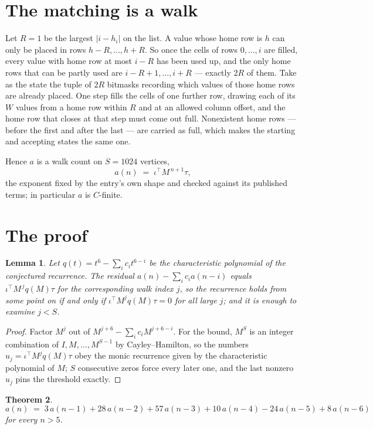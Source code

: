 \documentclass[11pt,a4paper]{article}
\theoremstyle{plain}
\newtheorem{theorem}{Theorem}
\newtheorem{lemma}[theorem]{Lemma}
\theoremstyle{definition}
\begin{document}
\section{The matching is a walk}

Let $R=1$ be the largest $|i-h_i|$ on the list. A value whose home row is $h$ can only be
placed in rows $h-R,\dots,h+R$. So once the cells of rows $0,\dots,i$ are filled, every
value with home row at most $i-R$ has been used up, and the only home rows that can be
partly used are $i-R+1,\dots,i+R$ --- exactly $2R$ of them. Take as the state the tuple of
$2R$ bitmasks recording which values of those home rows are already placed. One step fills
the cells of one further row, drawing each of its $W$ values from a home row within $R$
and at an allowed column offset, and the home row that closes at that step must come out
full. Nonexistent home rows --- before the first and after the last --- are carried as
full, which makes the starting and accepting states the same one.

Hence $a$ is a walk count on $S=1024$ vertices,
\[
a(n)\;=\;\iota^{\!\top}M^{\,n+1}\tau ,
\]
the exponent fixed by the entry's own shape and checked against its published terms; in
particular $a$ is $C$-finite.

\section{The proof}

\begin{lemma}\label{lem:crit}
Let $q(t)=t^{6}-\sum_i c_it^{6-i}$ be the characteristic polynomial of the
conjectured recurrence. The residual $a(n)-\sum_ic_ia(n-i)$ equals
$\iota^{\!\top}M^{\,j}q(M)\tau$ for the corresponding walk index $j$, so the recurrence
holds from some point on if and only if $\iota^{\!\top}M^{j}q(M)\tau=0$ for all large $j$;
and it is enough to examine $j<S$.
\end{lemma}

\begin{proof}
Factor $M^{j}$ out of $M^{j+6}-\sum_ic_iM^{j+6-i}$. For the bound, $M^{S}$
is an integer combination of $I,M,\dots,M^{S-1}$ by Cayley--Hamilton, so the numbers
$u_j=\iota^{\!\top}M^{j}q(M)\tau$ obey the monic recurrence given by the characteristic
polynomial of $M$; $S$ consecutive zeros force every later one, and the last nonzero $u_j$
pins the threshold exactly.
\end{proof}

\begin{theorem}
\[
a(n)\;=\;3\,a(n-1) + 28\,a(n-2) + 57\,a(n-3) + 10\,a(n-4) - 24\,a(n-5) + 8\,a(n-6)
\]
for every $n>5$.
\end{theorem}
\end{document}
